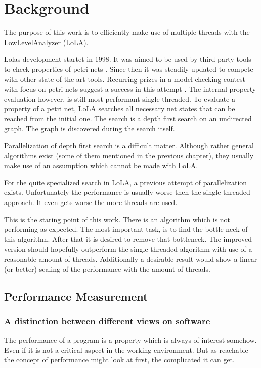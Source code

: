 \chapter{Background}

The purpose of this work is to efficiently make use of multiple threads with the LowLevelAnalyzer (LoLA).

Lolas development startet in 1998. It was aimed to be used by third party tools to check properties of petri nets \cite{schmidt2000lola}. Since then it was steadily updated to compete with other state of the art tools. Recurring prizes in a model checking contest with focus on petri nets suggest a success in this attempt \cite{MCC2017}.
The internal property evaluation however, is still most performant single threaded. To evaluate a property of a petri net, LoLA searches all necessary net states that can be reached from the initial one. The search is a depth first search on an undirected graph. The graph is discovered during the search itself.

Parallelization of depth first search is a difficult matter. Although rather general algorithms exist (some of them mentioned in the previous chapter), they usually make use of an assumption which cannot be made with LoLA.%

For the quite specialized search in LoLA, a previous attempt of parallelization exists. Unfortunately the performance is usually worse then the single threaded approach. It even gets worse the more threads are used.

This is the staring point of this work. There is an algorithm which is not performing as expected. The most important task, is to find the bottle neck of this algorithm. After that it is desired to remove that bottleneck. The improved version should hopefully outperform the single threaded algorithm with use of a reasonable amount of threads. Additionally a desirable result would show a linear (or better) scaling of the performance with the amount of threads.

\section{Performance Measurement}
\label{benchmarking}
\subsection{A distinction between different views on software}
The performance of a program is a property which is always of interest somehow. Even if it is not a critical aspect in the working environment. But as reachable the concept of performance might look at first, the complicated it can get.

